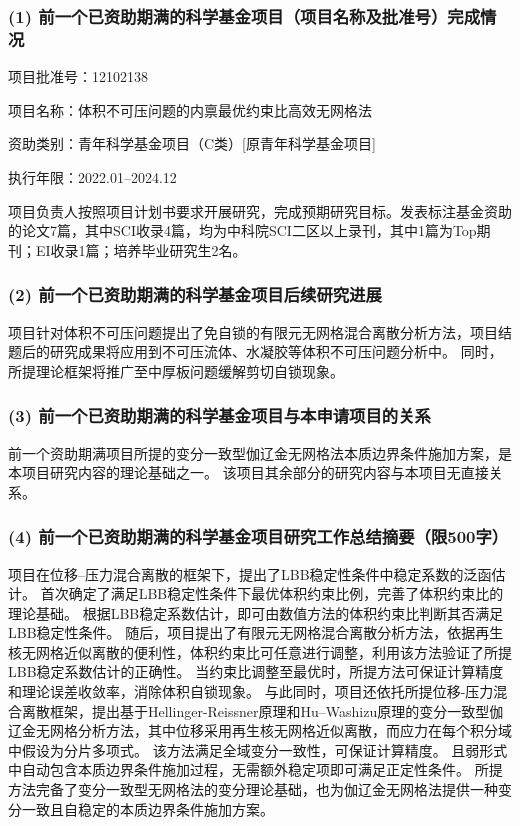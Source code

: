 \subsubsection*{\bfseries (1) 前一个已资助期满的科学基金项目（项目名称及批准号）完成情况}
\noindent
项目批准号：12102138

\noindent
项目名称：体积不可压问题的内禀最优约束比高效无网格法

\noindent
资助类别：青年科学基金项目（C类）[原青年科学基金项目]

\noindent
执行年限：2022.01--2024.12

项目负责人按照项目计划书要求开展研究，完成预期研究目标。发表标注基金资助的论文7篇，其中SCI收录4篇，均为中科院SCI二区以上录刊，其中1篇为Top期刊；EI收录1篇；培养毕业研究生2名。

\subsubsection*{\bfseries (2) 前一个已资助期满的科学基金项目后续研究进展}
项目针对体积不可压问题提出了免自锁的有限元无网格混合离散分析方法，项目结题后的研究成果将应用到不可压流体、水凝胶等体积不可压问题分析中。
同时，所提理论框架将推广至中厚板问题缓解剪切自锁现象。

\subsubsection*{\bfseries (3) 前一个已资助期满的科学基金项目与本申请项目的关系}
前一个资助期满项目所提的变分一致型伽辽金无网格法本质边界条件施加方案，是本项目研究内容的理论基础之一。
该项目其余部分的研究内容与本项目无直接关系。

\subsubsection*{\bfseries (4) 前一个已资助期满的科学基金项目研究工作总结摘要（限500字）}

项目在位移--压力混合离散的框架下，提出了LBB稳定性条件中稳定系数的泛函估计。
首次确定了满足LBB稳定性条件下最优体积约束比例，完善了体积约束比的理论基础。
根据LBB稳定系数估计，即可由数值方法的体积约束比判断其否满足LBB稳定性条件。
随后，项目提出了有限元无网格混合离散分析方法，依据再生核无网格近似离散的便利性，体积约束比可任意进行调整，利用该方法验证了所提LBB稳定系数估计的正确性。
当约束比调整至最优时，所提方法可保证计算精度和理论误差收敛率，消除体积自锁现象。
与此同时，项目还依托所提位移-压力混合离散框架，提出基于Hellinger-Reissner原理和Hu–Washizu原理的变分一致型伽辽金无网格分析方法，其中位移采用再生核无网格近似离散，而应力在每个积分域中假设为分片多项式。
该方法满足全域变分一致性，可保证计算精度。
且弱形式中自动包含本质边界条件施加过程，无需额外稳定项即可满足正定性条件。
所提方法完备了变分一致型无网格法的变分理论基础，也为伽辽金无网格法提供一种变分一致且自稳定的本质边界条件施加方案。
\newpage
